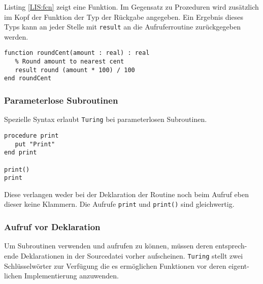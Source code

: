 \newpage

Listing \ref{LIS:fcn} zeigt eine Funktion. Im Gegensatz zu Prozeduren wird zus\"atzlich im Kopf der Funktion der Typ der R\"uckgabe angegeben. Ein Ergebnis dieses Typs kann an jeder Stelle mit \lstinline{result} an die Aufruferroutine zur\"uckgegeben werden.

\lstset{label=LIS:fcn}
\begin{table}[h!]
\begin{lstlisting}
function roundCent(amount : real) : real
   % Round amount to nearest cent
   result round (amount * 100) / 100
end roundCent
\end{lstlisting}
\end{table}

\subsubsection{Parameterlose Subroutinen}

Spezielle Syntax erlaubt \texttt{Turing} bei parameterlosen Subroutinen.

\lstset{label=LIS:proc0}
\begin{table}[h!]
\begin{lstlisting}
procedure print
   put "Print"
end print

print()
print
\end{lstlisting}
\end{table}

Diese verlangen weder bei der Deklaration der Routine noch beim Aufruf eben dieser keine Klammern. Die Aufrufe \lstinline{print} und \lstinline{print()} sind gleichwertig.

\subsubsection{Aufruf vor Deklaration}

Um Subroutinen verwenden und aufrufen zu k\"onnen, m\"ussen deren entsprech-ende Deklarationen in der Sourcedatei vorher aufscheinen.
\texttt{Turing} stellt zwei Schl\"usselw\"orter zur Verf\"ugung die es erm\"oglichen Funktionen vor deren eigent-lichen Implementierung anzuwenden.

